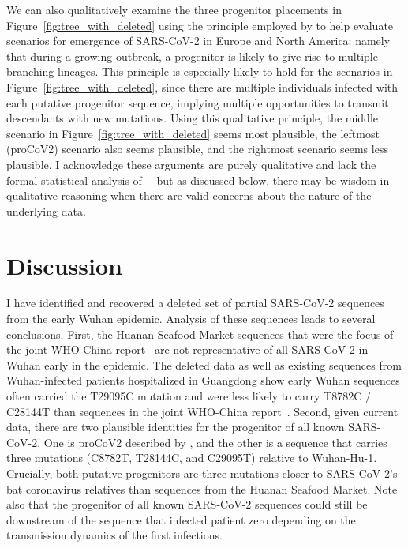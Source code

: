 \documentclass[9pt,twocolumn,twoside]{gsajnl_modified}
\begin{document}
We can also qualitatively examine the three progenitor placements in Figure~\ref{fig:tree_with_deleted} using the principle employed by \citet{worobey2020emergence} to help evaluate scenarios for emergence of SARS-CoV-2 in Europe and North America: namely that during a growing outbreak, a progenitor is likely to give rise to multiple branching lineages.
This principle is especially likely to hold for the scenarios in Figure~\ref{fig:tree_with_deleted}, since there are multiple individuals infected with each putative progenitor sequence, implying multiple opportunities to transmit descendants with new mutations.
Using this qualitative principle, the middle scenario in Figure~\ref{fig:tree_with_deleted} seems most plausible, the leftmost (proCoV2) scenario also seems plausible, and the rightmost scenario seems less plausible.
I acknowledge these arguments are purely qualitative and lack the formal statistical analysis of \citet{worobey2020emergence}---but as discussed below, there may be wisdom in qualitative reasoning when there are valid concerns about the nature of the underlying data.

\section{Discussion}
I have identified and recovered a deleted set of partial SARS-CoV-2 sequences from the early Wuhan epidemic.
Analysis of these sequences leads to several conclusions.
First, the Huanan Seafood Market sequences that were the focus of the joint WHO-China report~\citep{WHO2021origins} are not representative of all SARS-CoV-2 in Wuhan early in the epidemic.
The deleted data as well as existing sequences from Wuhan-infected patients hospitalized in Guangdong show early Wuhan sequences often carried the T29095C mutation and were less likely to carry T8782C / C28144T than sequences in the joint WHO-China report~\citep{WHO2021origins}.
Second, given current data, there are two plausible identities for the progenitor of all known SARS-CoV-2.
One is proCoV2 described by \citet{kumar2021evolutionary}, and the other is a sequence that carries three mutations (C8782T, T28144C, and C29095T) relative to Wuhan-Hu-1.
Crucially, both putative progenitors are three mutations closer to SARS-CoV-2's bat coronavirus relatives than sequences from the Huanan Seafood Market.
Note also that the progenitor of all known SARS-CoV-2 sequences could still be downstream of the sequence that infected patient zero depending on the transmission dynamics of the first infections.
\end{document}
